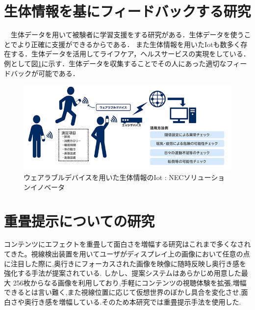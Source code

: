 \section{生体情報を基にフィードバックする研究}
　生体データを用いて被験者に学習支援をする研究がある\cite{seitai1,seitai2,seitai3}．生体データを使うことでより正確に支援ができるからである．
また生体情報を用いたIotも数多く存在する．生体データを活用してライフケア，ヘルスサービスの実現をしている．
例として図\ref{iot}に示す．生体データを収集することでその人にあった適切なフィードバックが可能である．

\begin{figure}[H]
    \centering
    \includegraphics[width=15cm]{images/chapter2/body_img02.png}
    \caption{ウェアラブルデバイスを用いた生体情報のIot : NECソリューションイノベータ}
    \label{iot}
\end{figure}


\section{重畳提示についての研究}
コンテンツにエフェクトを重畳して面白さを増幅する研究はこれまで多くなされてきた。視線検出装置を用いてユーザがディスプレイ上の画像において任意の点に注目した際に,奥行きにフォーカスされた画像を映像に随時反映し奥行き感を強化する手法が提案されている.\cite{sityoutaikenn}\cite{hisyakaisinndo}
しかし、提案システムはあらかじめ用意した最大 256枚からなる画像を利用しており,手軽にコンテンツの視聴体験を拡張,増幅できるとは言い難く,また視線位置に応じて仮想世界のぼかし具合を変化させ,面白さや奥行き感を増幅している\cite{efects_english}.そのため本研究では重畳提示手法を使用した.


